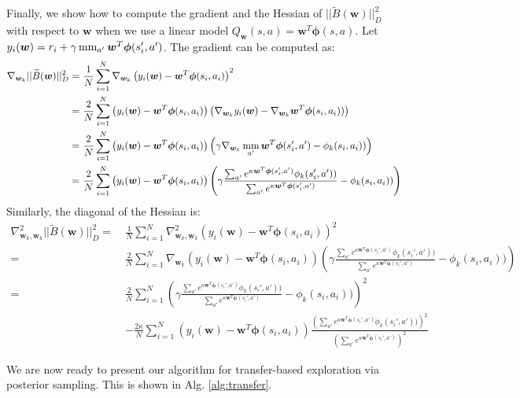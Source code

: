 \documentclass{article}
\newcommand{\mm}{\operatornamewithlimits{mm}}
\begin{document}
Finally, we show how to compute the gradient and the Hessian of $||\widetilde{B}(\bm{w})||_D^2$ with respect to $\bm{w}$ when we use a linear model $Q_{\bm{w}}(s,a) = \bm{w}^T\bm{\phi}(s,a)$. Let $y_i(\bm{w}) = r_i + \gamma\mm_{a'}\bm{w}^T\bm{\phi}(s_i',a')$. The gradient can be computed as:
\begin{align}
\nabla_{\bm{w}_k} ||\widetilde{B}(\bm{w})||_D^2 =\ & 
\frac{1}{N}\sum_{i=1}^N \nabla_{\bm{w}_k} \left( y_i(\bm{w}) - \bm{w}^T\bm{\phi}(s_i,a_i) \right)^2 \\ =\ &
\frac{2}{N}\sum_{i=1}^N \left( y_i(\bm{w}) - \bm{w}^T\bm{\phi}(s_i,a_i) \right)\left( \nabla_{\bm{w}_k}y_i(\bm{w}) - \nabla_{\bm{w}_k}\bm{w}^T\bm{\phi}(s_i,a_i)) \right) \\ =\ &
\frac{2}{N}\sum_{i=1}^N \left( y_i(\bm{w}) - \bm{w}^T\bm{\phi}(s_i,a_i) \right)\left( \gamma\nabla_{\bm{w}_k}\mm_{a'}\bm{w}^T\bm{\phi}(s_i',a') - \phi_k(s_i,a_i)) \right) \\ =\ &
\frac{2}{N}\sum_{i=1}^N \left( y_i(\bm{w}) - \bm{w}^T\bm{\phi}(s_i,a_i) \right)\left( \gamma\frac{\sum_{a'} e^{\kappa \bm{w}^T\bm{\phi}(s_i',a')} \phi_k(s_i',a'))}{\sum_{a'} e^{\kappa \bm{w}^T\bm{\phi}(s_i',a')}} - \phi_k(s_i,a_i)) \right)
\end{align}
Similarly, the diagonal of the Hessian is:
\begin{align}
\nabla_{\bm{w}_k,\bm{w}_k}^2 ||\widetilde{B}(\bm{w})||_D^2 =\ & 
\frac{1}{N}\sum_{i=1}^N \nabla_{\bm{w}_k,\bm{w}_k}^2 \left( y_i(\bm{w}) - \bm{w}^T\bm{\phi}(s_i,a_i) \right)^2 \\ =\ &
\frac{2}{N}\sum_{i=1}^N \nabla_{\bm{w}_k} \left( y_i(\bm{w}) - \bm{w}^T\bm{\phi}(s_i,a_i) \right)\left( \gamma\frac{\sum_{a'} e^{\kappa \bm{w}^T\bm{\phi}(s_i',a')} \phi_k(s_i',a'))}{\sum_{a'} e^{\kappa \bm{w}^T\bm{\phi}(s_i',a')}} - \phi_k(s_i,a_i)) \right) \\ =\ &
\frac{2}{N}\sum_{i=1}^N \left( \gamma\frac{\sum_{a'} e^{\kappa \bm{w}^T\bm{\phi}(s_i',a')} \phi_k(s_i',a'))}{\sum_{a'} e^{\kappa \bm{w}^T\bm{\phi}(s_i',a')}} - \phi_k(s_i,a_i)) \right)^2 \\ \ \ & - \frac{2\kappa}{N}\sum_{i=1}^N \left( y_i(\bm{w}) - \bm{w}^T\bm{\phi}(s_i,a_i) \right) \frac{\left(\sum_{a'} e^{\kappa \bm{w}^T\bm{\phi}(s_i',a')} \phi_k(s_i',a'))\right)^2}{\left(\sum_{a'} e^{\kappa \bm{w}^T\bm{\phi}(s_i',a')}\right)^2}
\end{align}

We are now ready to present our algorithm for transfer-based exploration via posterior sampling. This is shown in Alg. \ref{alg:transfer}.
\end{document}
